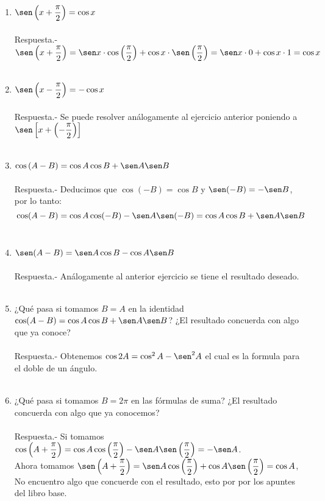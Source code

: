\begin{enumerate}
\item $\sen\left(x + \dfrac{\pi}{2}\right)=\cos x$\\\\
    Respuesta.-\; $\sen\left(x + \dfrac{\pi}{2}\right)= \sen x \cdot \cos \left(\dfrac{\pi}{2}\right) + \cos x \cdot \sen \left(\dfrac{\pi}{2}\right) = \sen x \cdot 0 + \cos x \cdot 1 = \cos x$\\\\

\item $\sen \left(x-\dfrac{\pi}{2}\right) = - \cos x$\\\\
    Respuesta.-\; Se puede resolver análogamente al ejercicio anterior poniendo a $\sen \left[x + \left(-\dfrac{\pi}{2}\right)\right]$\\\\

\item $\cos\left(A-B\right) = \cos A \cos B + \sen A \sen B$\\\\
    Respuesta.-\; Deducimos que $\cos(-B)=\cos B$ y $\sen(-B)=-\sen B$, por lo tanto: $$\cos(A-B)=\cos A \cos (-B) - \sen A \sen (-B) = \cos A \cos B + \sen A \sen B$$\\ 

\item $\sen (A-B) = \sen A \cos B - \cos A \sen B$\\\\
    Respuesta.-\; Análogamente al anterior ejercicio se tiene el resultado deseado.\\\\ 

\item ¿Qué pasa si tomamos $B=A$ en la identidad $\cos(A-B)=\cos A \cos B + \sen A \sen B$? ¿El resultado concuerda con algo que ya conoce?\\\\
    Respuesta.-\; Obtenemos $\cos 2A = \cos^2 A - \sen^2 A$ el cual es la formula para el doble de un ángulo.\\\\

\item ¿Qué pasa si tomamos $B=2\pi$ en las fórmulas de suma? ¿El resultado concuerda con algo que ya conocemos?\\\\
    Respuesta.-\; Si tomamos $\cos\left(A+\dfrac{\pi}{2}\right) = \cos A \cos\left(\dfrac{\pi}{2}\right) - \sen A \sen\left(\dfrac{\pi}{2}\right) = - \sen A$.\\ Ahora tomamos $\sen\left(A + \dfrac{\pi}{2}\right) = \sen A \cos\left(\dfrac{\pi}{2}\right) + \cos A \sen\left(\dfrac{\pi}{2}\right) = \cos A$, No encuentro algo que concuerde con el resultado, esto por por los apuntes del libro base.\\\\


\end{enumerate}
